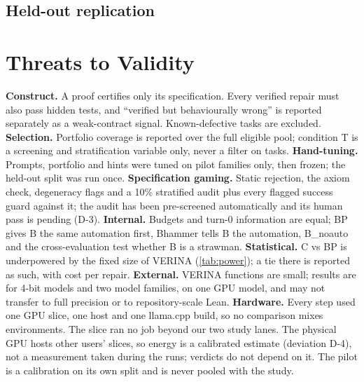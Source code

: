 \documentclass[10pt,twocolumn]{article}
\begin{document}
\subsection{Held-out replication}
\resHeldoutText

\section{Threats to Validity}
\textbf{Construct.} A proof certifies only its specification. Every verified repair must also pass hidden tests,
and ``verified but behaviourally wrong'' is reported separately as a weak-contract signal. Known-defective tasks
are excluded.
\textbf{Selection.} Portfolio coverage is reported over the full eligible pool; condition T is a screening and
stratification variable only, never a filter on tasks.
\textbf{Hand-tuning.} Prompts, portfolio and hints were tuned on pilot families only, then frozen; the held-out
split was run once.
\textbf{Specification gaming.} Static rejection, the axiom check, degeneracy flags and a 10\% stratified
audit plus every flagged success guard against it; the audit has been pre-screened automatically and its human
pass is pending (D-3).
\textbf{Internal.} Budgets and turn-0 information are equal; BP gives B the same automation first, Bhammer tells
B the automation, B\_noauto and the cross-evaluation test whether B is a strawman.
\textbf{Statistical.} C vs BP is underpowered by the fixed size of VERINA (\cref{tab:power}); a tie there is
reported as such, with cost per repair.
\textbf{External.} VERINA functions are small; results are for 4-bit models and two model families, on one GPU
model, and may not transfer to full precision or to repository-scale Lean.
\textbf{Hardware.} Every step used one GPU slice, one host and one llama.cpp build, so no comparison mixes
environments. The slice ran no job beyond our two study lanes. The physical GPU hosts other users' slices, so
energy is a calibrated estimate (deviation D-4), not a measurement taken during the runs; verdicts do not depend on it. The pilot is a calibration on its own
split and is never pooled with the study.
\end{document}
